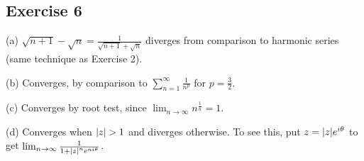 \subsection{Exercise 6}
(a) $\sqrt{n + 1} - \sqrt{n} = \frac{1}{\sqrt{n + 1} + \sqrt{n}}$ diverges from comparison
to harmonic series (same technique as Exercise 2).

(b) Converges, by comparison to $\sum_{n = 1}^{\infty} \frac{1}{n^p}$ for $p = \frac{3}{2}$.

(c) Converges by root test, since $\lim_{n \to \infty} n^{\frac{1}{n}} = 1$.

(d) Converges when $\abs{z} > 1$ and diverges otherwise. To see this, put $z = \abs{z}e^{i\theta}$ 
to get $\lim_{n \to \infty} \frac{1}{1 + \abs{z}^n e^{ni\theta}}$.
